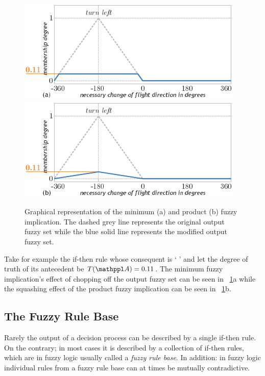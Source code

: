 \begin{figure}%
\includegraphics{fig[fuzzyImplication]a}\\
\vspace*{2mm}
\includegraphics{fig[fuzzyImplication]b}
\caption{Graphical representation of the minimum (a) and product (b) fuzzy implication. The dashed grey line represents the original output fuzzy set while the blue solid line represents the modified output fuzzy set.}
\label{fig:implication}
\end{figure}

Take for example the if-then rule whose consequent is `  ' and let the degree of truth of its antecedent be $T(\statement{A})=0.11$. The minimum fuzzy implication's effect of chopping off the output fuzzy set can be seen in \fig~\ref{fig:implication}a while the squashing effect of the product fuzzy implication can be seen in \fig~\ref{fig:implication}b. 

\subsection{The Fuzzy Rule Base}
\label{sec:fuzzyModelling:fuzzyRuleBase}
Rarely the output of a decision process can be described by a single if-then rule. On the contrary; in most cases it is described by a collection of if-then rules, which are in fuzzy logic usually called a \emph{fuzzy rule base}. In addition: in fuzzy logic individual rules from a fuzzy rule base can at times be mutually contradictive. 

